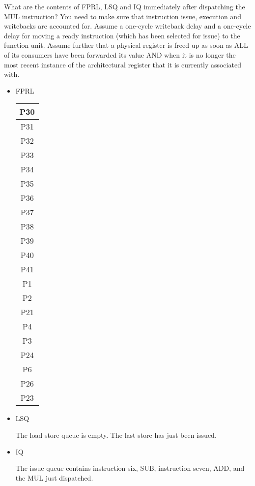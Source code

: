 \documentclass[12pt,letterpaper,twoside]{hmcpset}
\begin{document}
\begin{problem}[2b]
 What are the contents of FPRL, LSQ and IQ immediately after dispatching the MUL instruction?  You need to make sure that instruction issue, execution and writebacks are accounted for.  Assume a one-cycle writeback delay and a one-cycle delay for moving a ready instruction (which has been selected for issue) to the function unit.  Assume further that a physical register is freed up as soon as ALL of its consumers have been forwarded its value AND when it is no longer the most recent instance of the architectural register that it is currently associated with.
\end{problem}

\begin{solution}
 \begin{itemize}
  \item FPRL
  
\begin{tabular}{|c|}
\hline
P30 \\ \hline P31 \\ \hline P32 \\ \hline P33 \\ \hline P34 \\ \hline P35 \\ \hline P36 \\ \hline P37 \\ \hline P38 \\ \hline P39 \\ \hline P40 \\ \hline P41 \\ \hline P1 \\ \hline P2 \\ \hline P21 \\ \hline P4 \\ \hline P3 \\ \hline P24 \\ \hline P6 \\ \hline P26 \\ \hline P23\\
\hline
  \end{tabular}
\item LSQ

The load store queue is empty.  The last store has just been issued.
\item IQ

The issue queue contains instruction six, SUB, instruction seven, ADD, and the MUL just dispatched.
 \end{itemize}

\end{solution}
\end{document}
